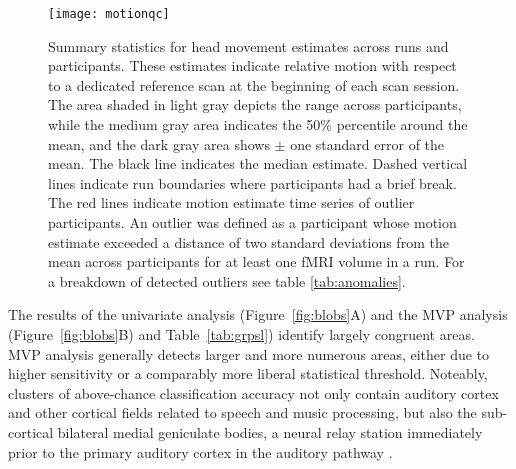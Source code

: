 \documentclass[10pt,a4paper,twocolumn]{article}
\begin{document}
\begin{figure}
  \centering
  \texttt{[image: motionqc]}\\
  \caption{Summary statistics for head movement estimates across runs
    and participants.
   These estimates indicate relative motion with respect to a dedicated reference scan
   at the beginning of each scan session. The area shaded in light gray depicts
   the range across participants, while the medium gray area indicates the 50\%
   percentile around the mean, and the dark gray area shows $\pm$ one
   standard error of the mean. The black line indicates the median estimate.
   Dashed vertical lines indicate run boundaries where participants had a brief
   break. The red lines indicate motion estimate time series of outlier
   participants. An outlier was defined as a participant whose motion estimate
   exceeded a distance of two standard deviations from the mean across
   participants for at least one fMRI volume in a run. For a breakdown of
   detected outliers see table \ref{tab:anomalies}.}
  \label{fig:motionqc}
\end{figure}

The results of the univariate analysis (Figure~\ref{fig:blobs}A) and the MVP
analysis (Figure~\ref{fig:blobs}B) and Table~\ref{tab:grpsl}) identify largely
congruent areas. MVP analysis generally detects larger and more numerous areas,
either due to higher sensitivity or a comparably more liberal statistical
threshold. Noteably, clusters of above-chance classification accuracy not only
contain auditory cortex and other cortical fields related to speech and music
processing, but also the sub-cortical bilateral medial geniculate bodies, a
neural relay station immediately prior to the primary auditory cortex in the
auditory pathway \cite{KSR+2005}.
\end{document}
